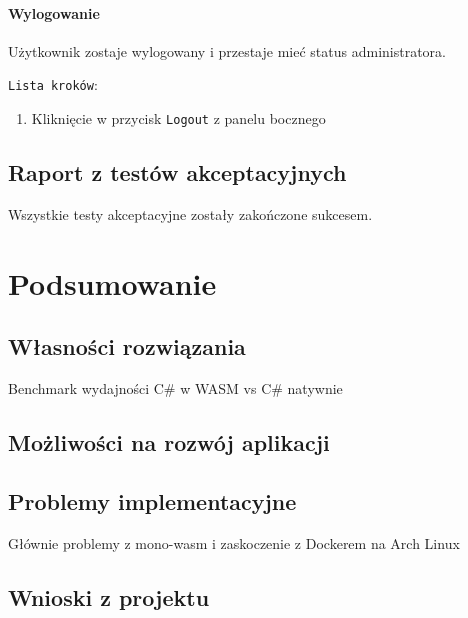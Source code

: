 \documentclass[a4paper,11pt,twoside]{report}
\theoremstyle{definition}
\begin{document}
    		\subsubsection{Wylogowanie}
    			Użytkownik zostaje wylogowany i przestaje mieć status administratora.

				\texttt{Lista kroków}:
				\begin{enumerate}
					\item Kliknięcie w przycisk \texttt{Logout} z panelu bocznego
				\end{enumerate}

    		\subsubsection{}	
    		
    \section{Raport z testów akceptacyjnych}
    
    	Wszystkie testy akceptacyjne zostały zakończone sukcesem.

\chapter{Podsumowanie}
    \section{Własności rozwiązania}
        Benchmark wydajności C\# w WASM vs C\# natywnie
    
    \section{Możliwości na rozwój aplikacji}
    
    \section{Problemy implementacyjne}
        Głównie problemy z mono-wasm i zaskoczenie z Dockerem na Arch Linux
    
    \section{Wnioski z projektu}
        


\end{document}
